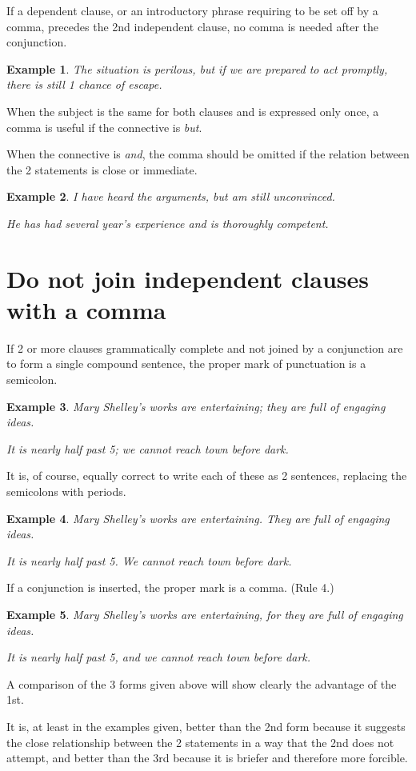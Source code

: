 \documentclass{book}
\numberwithin{equation}{section}
\newtheorem{example}{Example}[chapter]
\begin{document}
%
If a dependent clause, or an introductory phrase requiring to be set off by a comma, precedes the 2nd independent clause, no comma is needed after the conjunction.
\begin{example}
    The situation is perilous, but if we are prepared to act promptly, there is still 1 chance of escape.
\end{example}
When the subject is the same for both clauses and is expressed only once, a comma is useful if the connective is \textit{but}.

When the connective is \textit{and}, the comma should be omitted if the relation between the 2 statements is close or immediate.
\begin{example}
    I have heard the arguments, but am still unconvinced.
    
    He has had several year's experience and is thoroughly competent.
\end{example}

\section{Do not join independent clauses with a comma}
If 2 or more clauses grammatically complete and not joined by a conjunction are to form a single compound sentence, the proper mark of punctuation is a semicolon.
\begin{example}
    Mary Shelley's works are entertaining; they are full of engaging ideas.
    
    It is nearly half past 5; we cannot reach town before dark.
\end{example}
It is, of course, equally correct to write each of these as 2 sentences, replacing the semicolons with periods.
\begin{example}
    Mary Shelley's works are entertaining. They are full of engaging ideas.
    
    It is nearly half past 5. We cannot reach town before dark.
\end{example}
If a conjunction is inserted, the proper mark is a comma. (Rule 4.)
\begin{example}
    Mary Shelley's works are entertaining, for they are full of engaging ideas.
    
    It is nearly half past 5, and we cannot reach town before dark.
\end{example}
A comparison of the 3 forms given above will show clearly the advantage of the 1st.

It is, at least in the examples given, better than the 2nd form because it suggests the close relationship between the 2 statements in a way that the 2nd does not attempt, and better than the 3rd because it is briefer and therefore more forcible.
\end{document}
